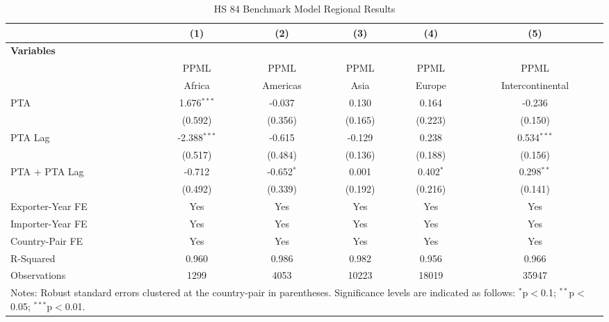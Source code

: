 \begin{table}[htbp]
    \centering
    \caption{HS 84 Benchmark Model Regional Results}
    \label{tab:84_benchmark_region_analysis} %
    \begin{adjustbox}{max width=\textwidth}
    \begin{tabular}{l@{\extracolsep{1pt}}ccccc}
    \hline
    & \multicolumn{1}{c}{(1)} & \multicolumn{1}{c}{(2)} & \multicolumn{1}{c}{(3)} & \multicolumn{1}{c}{(4)} & \multicolumn{1}{c}{(5)} \\
    \hline
    \textbf{Variables} &  &  &  &  &  \\
    \hline
     & PPML & PPML & PPML & PPML & PPML \\
     & Africa & Americas & Asia & Europe & Intercontinental \\
    \hline
    PTA & 1.676$^{\ast\ast\ast}$ & -0.037 & 0.130 & 0.164 & -0.236 \\
    & (0.592) & (0.356) & (0.165) & (0.223) & (0.150) \\

    PTA Lag & -2.388$^{\ast\ast\ast}$ & -0.615 & -0.129 & 0.238 & 0.534$^{\ast\ast\ast}$ \\
    & (0.517) & (0.484) & (0.136) & (0.188) & (0.156) \\

    PTA + PTA Lag & -0.712 & -0.652$^{\ast}$ & 0.001 & 0.402$^{\ast}$ & 0.298$^{\ast\ast}$ \\
    & (0.492) & (0.339) & (0.192) & (0.216) & (0.141) \\
    \hline
    Exporter-Year FE & Yes & Yes & Yes & Yes & Yes \\
    Importer-Year FE & Yes & Yes & Yes & Yes & Yes \\
    Country-Pair FE & Yes & Yes & Yes & Yes & Yes \\
    R-Squared & 0.960 & 0.986 & 0.982 & 0.956 & 0.966 \\
    Observations & 1299 & 4053 & 10223 & 18019 & 35947 \\
    \hline
    \multicolumn{6}{l}{\footnotesize{Notes: Robust standard errors clustered at the country-pair in parentheses. Significance levels are indicated as follows: $^{\ast}$p$<$0.1; $^{\ast\ast}$p$<$0.05; $^{\ast\ast\ast}$p$<$0.01.}} \\
    \end{tabular}
    \end{adjustbox}
\end{table}

